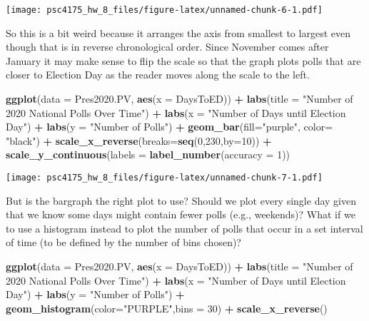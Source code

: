 \documentclass[
]{article}
\newenvironment{Shaded}{\begin{snugshade}}{\end{snugshade}}
\newcommand{\AttributeTok}[1]{\textcolor[rgb]{0.13,0.29,0.53}{#1}}
\newcommand{\DecValTok}[1]{\textcolor[rgb]{0.00,0.00,0.81}{#1}}
\newcommand{\FunctionTok}[1]{\textcolor[rgb]{0.13,0.29,0.53}{\textbf{#1}}}
\newcommand{\NormalTok}[1]{#1}
\newcommand{\SpecialCharTok}[1]{\textcolor[rgb]{0.81,0.36,0.00}{\textbf{#1}}}
\newcommand{\StringTok}[1]{\textcolor[rgb]{0.31,0.60,0.02}{#1}}
\begin{document}
\texttt{[image: psc4175\_hw\_8\_files/figure-latex/unnamed-chunk-6-1.pdf]}

So this is a bit weird because it arranges the axis from smallest to
largest even though that is in reverse chronological order. Since
November comes after January it may make sense to flip the scale so that
the graph plots polls that are closer to Election Day as the reader
moves along the scale to the left.

\begin{Shaded}
\begin{Highlighting}[]
\FunctionTok{ggplot}\NormalTok{(}\AttributeTok{data =}\NormalTok{ Pres2020.PV, }\FunctionTok{aes}\NormalTok{(}\AttributeTok{x =}\NormalTok{ DaysToED)) }\SpecialCharTok{+}
  \FunctionTok{labs}\NormalTok{(}\AttributeTok{title =} \StringTok{"Number of 2020 National Polls Over Time"}\NormalTok{) }\SpecialCharTok{+} 
  \FunctionTok{labs}\NormalTok{(}\AttributeTok{x =} \StringTok{"Number of Days until Election Day"}\NormalTok{) }\SpecialCharTok{+} 
  \FunctionTok{labs}\NormalTok{(}\AttributeTok{y =} \StringTok{"Number of Polls"}\NormalTok{) }\SpecialCharTok{+} 
  \FunctionTok{geom\_bar}\NormalTok{(}\AttributeTok{fill=}\StringTok{"purple"}\NormalTok{, }\AttributeTok{color=} \StringTok{"black"}\NormalTok{) }\SpecialCharTok{+}
  \FunctionTok{scale\_x\_reverse}\NormalTok{(}\AttributeTok{breaks=}\FunctionTok{seq}\NormalTok{(}\DecValTok{0}\NormalTok{,}\DecValTok{230}\NormalTok{,}\AttributeTok{by=}\DecValTok{10}\NormalTok{)) }\SpecialCharTok{+}
  \FunctionTok{scale\_y\_continuous}\NormalTok{(}\AttributeTok{labels =} \FunctionTok{label\_number}\NormalTok{(}\AttributeTok{accuracy =} \DecValTok{1}\NormalTok{))}
\end{Highlighting}
\end{Shaded}

\texttt{[image: psc4175\_hw\_8\_files/figure-latex/unnamed-chunk-7-1.pdf]}

But is the bargraph the right plot to use? Should we plot every single
day given that we know some days might contain fewer polls (e.g.,
weekends)? What if we to use a histogram instead to plot the number of
polls that occur in a set interval of time (to be defined by the number
of bins chosen)?

\begin{Shaded}
\begin{Highlighting}[]
\FunctionTok{ggplot}\NormalTok{(}\AttributeTok{data =}\NormalTok{ Pres2020.PV, }\FunctionTok{aes}\NormalTok{(}\AttributeTok{x =}\NormalTok{ DaysToED)) }\SpecialCharTok{+}
  \FunctionTok{labs}\NormalTok{(}\AttributeTok{title =} \StringTok{"Number of 2020 National Polls Over Time"}\NormalTok{) }\SpecialCharTok{+} 
  \FunctionTok{labs}\NormalTok{(}\AttributeTok{x =} \StringTok{"Number of Days until Election Day"}\NormalTok{) }\SpecialCharTok{+} 
  \FunctionTok{labs}\NormalTok{(}\AttributeTok{y =} \StringTok{"Number of Polls"}\NormalTok{) }\SpecialCharTok{+} 
  \FunctionTok{geom\_histogram}\NormalTok{(}\AttributeTok{color=}\StringTok{"PURPLE"}\NormalTok{,}\AttributeTok{bins =} \DecValTok{30}\NormalTok{) }\SpecialCharTok{+}
  \FunctionTok{scale\_x\_reverse}\NormalTok{()}
\end{Highlighting}
\end{Shaded}
\end{document}
